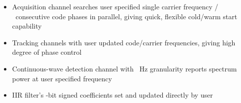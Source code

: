 \documentclass{article}
\begin{document}
\begin{multicols}{2}
\renewcommand{\labelitemi}{\color{alt}\footnotesize{$\bullet$}}
\begin{itemize}
    \setlength{\itemsep}{0pt}
    \item Acquisition channel searches user specified single carrier frequency / \acqntaps\ consecutive code phases in parallel, giving quick, flexible cold/warm start capability
    \item Tracking channels with user updated code/carrier frequencies, giving high degree of phase control
    \item Continuous-wave detection channel with \cwgranularityhz\ Hz granularity reports spectrum power at user specified frequency 
    \item IIR filter's \iirnbits-bit signed coefficients set and updated directly by user
\end{itemize}

\pagebreak
\tableofcontents
\pagebreak

\end{multicols}
\end{document}
